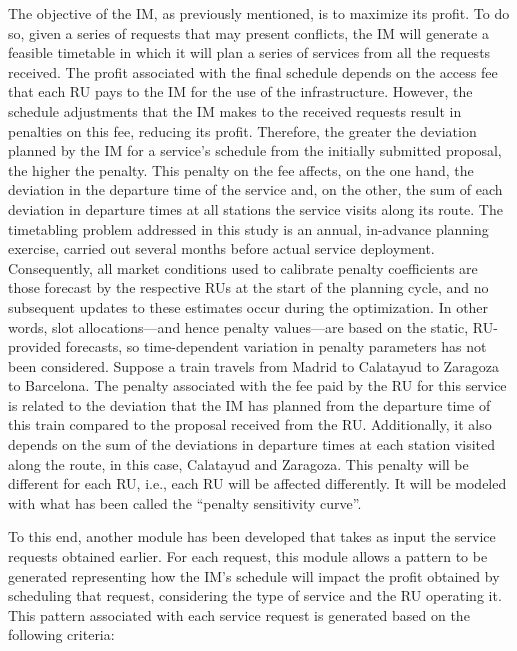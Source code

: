 \documentclass[Afour,sagev,times]{sagej}
\begin{document}
The objective of the IM, as previously mentioned, is to maximize its profit. To do so, given a series of requests that may present conflicts, the \gls{IM} will generate a feasible timetable in which it will plan a series of services from all the requests received. The profit associated with the final schedule depends on the access fee that each \gls{RU} pays to the \gls{IM} for the use of the infrastructure. However, the schedule adjustments that the \gls{IM} makes to the received requests result in penalties on this fee, reducing its profit. Therefore, the greater the deviation planned by the \gls{IM} for a service's schedule from the initially submitted proposal, the higher the penalty. This penalty on the fee affects, on the one hand, the deviation in the departure time of the service and, on the other, the sum of each deviation in departure times at all stations the service visits along its route. The timetabling problem addressed in this study is an annual, in-advance planning exercise, carried out several months before actual service deployment. Consequently, all market conditions used to calibrate penalty coefficients are those forecast by the respective \glspl{RU} at the start of the planning cycle, and no subsequent updates to these estimates occur during the optimization. In other words, slot allocations—and hence penalty values—are based on the static, \gls{RU}-provided forecasts, so time-dependent variation in penalty parameters has not been considered. Suppose a train travels from Madrid to Calatayud to Zaragoza to Barcelona. The penalty associated with the fee paid by the \gls{RU} for this service is related to the deviation that the \gls{IM} has planned from the departure time of this train compared to the proposal received from the \gls{RU}. Additionally, it also depends on the sum of the deviations in departure times at each station visited along the route, in this case, Calatayud and Zaragoza. This penalty will be different for each RU, i.e., each \gls{RU} will be affected differently. It will be modeled with what has been called the ``penalty sensitivity curve''.

To this end, another module has been developed that takes as input the service requests obtained earlier. For each request, this module allows a pattern to be generated representing how the IM's schedule will impact the profit obtained by scheduling that request, considering the type of service and the \gls{RU} operating it. This pattern associated with each service request is generated based on the following criteria:
\end{document}
